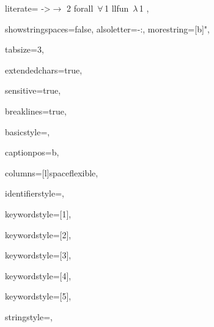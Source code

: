 {%
literate=	
	{->}{{$\rightarrow\,\,$}}2		
	{forall\ }{{$\forall\,$}}1		
	{llfun\ }{{$\lambda\,$}}1
,


showstringspaces=false,
alsoletter={-:},
morestring=[b]",

tabsize=3,							

extendedchars=true,  		 		

sensitive=true, 

breaklines=true,

basicstyle=\ttfamily\footnotesize,

captionpos=b,							

columns=[l]spaceflexible,

identifierstyle={\ttfamily\color{black}},

keywordstyle=[1]{\ttfamily\color{dkviolet}},

keywordstyle=[2]{\ttfamily\color{dkgreen}},

keywordstyle=[3]{\ttfamily\color{lightblue}},

keywordstyle=[4]{\ttfamily\color{dkblue}},

keywordstyle=[5]{\ttfamily\color{red}},



stringstyle=\ttfamily\color{dkviolet},


}

